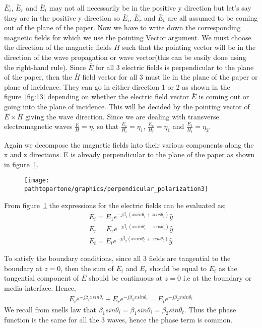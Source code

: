 $\bar{E}_{i}$, $\bar{E}_{r}$ and  $\bar{E}_{t}$ may not all necessarily be in the positive y direction but let's say they are in the positive y direction so  $\bar{E}_{i}$,  $\bar{E}_{r}$ and  $\bar{E}_{t}$ are all assumed to be coming out of the plane of the paper. Now we have to write down the corresponding magnetic fields for which we use the pointing Vector argument. We must choose the direction of the magnetic fields $\bar{H}$ such that the pointing vector will be in the direction of the wave propagation or wave vector(this can be easily done using the right-hand rule). Since $\bar{E}$ for all 3 electric fields is perpendicular to the plane of the paper, then the $\bar{H}$ field vector for all 3 must lie in the plane of the paper or plane of incidence. They can go in either direction 1 or 2 as shown in the figure~\ref{fig:13} depending on whether the electric field vector $\bar{E}$ is coming out or going into the plane of incidence. This will be decided by the pointing vector of  $\bar{E} \times \bar{H}$ giving the wave direction. Since we are dealing with transverse electromagnetic waves $\frac{E}{H} = \eta$, so that $\frac{E_{i}}{H_{i}} = \eta_{1}$, $\frac{E_{r}}{H_{r}} = \eta_{1}$ and  $\frac{E_{t}}{H_{t}} = \eta_{2}$.

Again we decompose the magnetic fields into their various components along the x and z directions. E is already perpendicular to the plane of the paper as shown in figure~\ref{fig:14}.
\begin{figure}[h]
\centering
\texttt{[image: \\pathtopartone/graphics/perpendicular\_polarization3]}
\caption{}
\label{fig:14}
\end{figure}

From figure~\ref{fig:14} the expressions for the electric fields can be evaluated as;
\begin{align*}
\bar{E_{i}} = E_{1} e^{-j\beta_{1} (x sin\theta_{i} + z cos\theta_{i})} \hat{y}\\
\bar{E_{r}} = E_{r} e^{-j\beta_{1} (x sin\theta_{i} - z cos\theta_{i})} \hat{y}\\
\bar{E_{t}} = E_{t} e^{-j\beta_{2} (x sin\theta_{t} + z cos\theta_{t})} \hat{y}
\end{align*}

To satisfy the boundary conditions, since all 3 fields are tangential to the boundary at $z=0$, then the sum of $E_i$ and $E_r$ should be equal to $E_{t}$ as the tangential component of $\bar{E}$ should be continuous at $z=0$ i.e at the boundary or media interface.
Hence,
\begin{align*}
E_{i} e^{-j \beta_{i} x sin\theta_{i}} + E_{r} e^{-j \beta_{1} x sin\theta_{i}} = E_{t} e^{-j \beta_{2} x sin\theta_{t}}
\end{align*}
We recall from snells law that $\beta_{1} sin\theta_{i} = \beta_{1} sin\theta_{i} = \beta_{2} sin\theta_{t}$. Thus the phase function is the same for all the 3 waves, hence the phase term is common.

